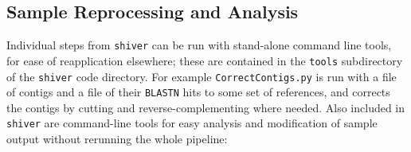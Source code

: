 \documentclass{article}
\newcommand{\shiv}{\texttt{shiver}\xspace}
\let\c\texttt
\begin{document}
\subsection*{Sample Reprocessing and Analysis}
Individual steps from \shiv can be run with stand-alone command line tools, for ease of reapplication elsewhere; these are contained in the \c{tools} subdirectory of the \shiv code directory.
For example \texttt{CorrectContigs.py} is run with a file of contigs and a file of their \texttt{BLASTN} hits to some set of references, and corrects the contigs by cutting and reverse-complementing where needed.
Also included in \shiv are command-line tools for easy analysis and modification of sample output without rerunning the whole pipeline:
\end{document}
